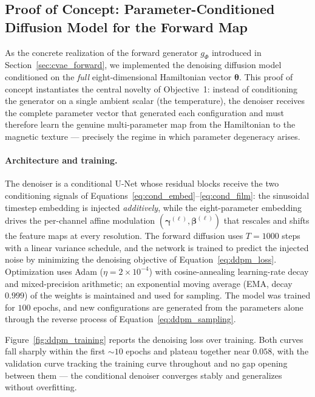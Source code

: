 \documentclass[letterpaper, 12, one column]{article}
\begin{document}
\subsection{Proof of Concept: Parameter-Conditioned Diffusion Model for the Forward Map}\label{sec:ddpm_poc}

As the concrete realization of the forward generator $g_{\Phi}$ introduced in Section~\ref{sec:cvae_forward}, we implemented the denoising diffusion model conditioned on the \emph{full} eight-dimensional Hamiltonian vector $\boldsymbol{\theta}$. This proof of concept instantiates the central novelty of Objective~1: instead of conditioning the generator on a single ambient scalar (the temperature), the denoiser receives the complete parameter vector that generated each configuration and must therefore learn the genuine multi-parameter map from the Hamiltonian to the magnetic texture --- precisely the regime in which parameter degeneracy arises.

\paragraph{Architecture and training.}
The denoiser is a conditional U-Net whose residual blocks receive the two conditioning signals of Equations~\ref{eq:cond_embed}--\ref{eq:cond_film}: the sinusoidal timestep embedding is injected \emph{additively}, while the eight-parameter embedding drives the per-channel affine modulation $(\boldsymbol{\gamma}^{(\ell)},\boldsymbol{\beta}^{(\ell)})$ that rescales and shifts the feature maps at every resolution. The forward diffusion uses $T=1000$ steps with a linear variance schedule, and the network is trained to predict the injected noise by minimizing the denoising objective of Equation~\ref{eq:ddpm_loss}. Optimization uses Adam ($\eta=2\times10^{-4}$) with cosine-annealing learning-rate decay and mixed-precision arithmetic; an exponential moving average (EMA, decay $0.999$) of the weights is maintained and used for sampling. The model was trained for $100$ epochs, and new configurations are generated from the parameters alone through the reverse process of Equation~\ref{eq:ddpm_sampling}.

Figure~\ref{fig:ddpm_training} reports the denoising loss over training. Both curves fall sharply within the first $\sim\!10$ epochs and plateau together near $0.058$, with the validation curve tracking the training curve throughout and no gap opening between them --- the conditional denoiser converges stably and generalizes without overfitting.
\end{document}
